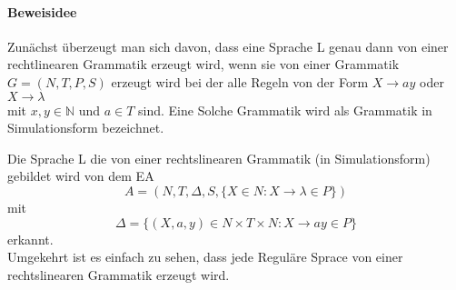 \paragraph*{Beweisidee}
Zunächst überzeugt man sich davon, dass eine Sprache L genau dann von einer rechtlinearen Grammatik erzeugt wird, wenn sie von einer Grammatik \(G=(N,T,P,S)\) erzeugt wird bei der alle Regeln von der Form \(X\to ay\) oder \(X\to \lambda\)\\
mit \(x,y\in\mathbb{N}\) und \(a\in T\) sind. Eine Solche Grammatik wird als Grammatik in Simulationsform bezeichnet.\par\bigskip
Die Sprache L die von einer rechtslinearen Grammatik (in Simulationsform) gebildet wird von dem EA 
\[A=(N,T,\Delta,S,\{X\in N: X\to \lambda\in P\})\]
mit 
\[\Delta=\{(X,a,y)\in N\times T\times N:X\to ay\in P\}\]
erkannt.\\
Umgekehrt ist es einfach zu sehen, dass jede Reguläre Sprace von einer rechtslinearen Grammatik erzeugt wird.